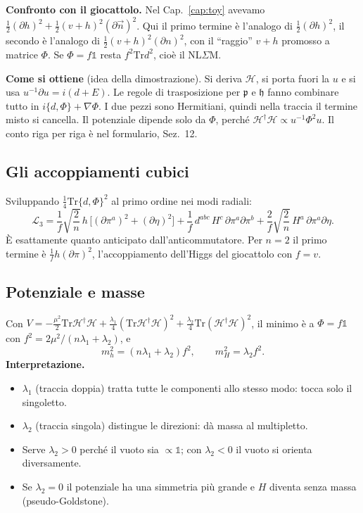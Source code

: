 \documentclass[11pt,a4paper]{article}
\numberwithin{equation}{section}
\theoremstyle{remark}
\newcommand{\Tr}{\mathrm{Tr}}
\newcommand{\Hf}{\mathcal{H}}
\newcommand{\p}{\mathfrak{p}}
\newcommand{\h}{\mathfrak{h}}
\newcommand{\one}{\mathbb{1}}
\begin{document}
\textbf{Confronto con il giocattolo.} Nel Cap.~\ref{cap:toy} avevamo $\frac12(\partial h)^2+\frac12(v+h)^2(\partial\vec n)^2$. Qui il primo termine è l'analogo di $\frac12(\partial h)^2$, il secondo è l'analogo di $\frac12(v+h)^2(\partial n)^2$, con il ``raggio'' $v+h$ promosso a matrice $\Phi$. Se $\Phi=f\one$ resta $f^2\Tr d^2$, cioè il NL$\Sigma$M.

\textbf{Come si ottiene} (idea della dimostrazione). Si deriva $\Hf$, si porta fuori la $u$ e si usa $u^{-1}\partial u=i(d+E)$. Le regole di trasposizione per $\p$ e $\h$ fanno combinare tutto in $i\{d,\Phi\}+\nabla\Phi$. I due pezzi sono Hermitiani, quindi nella traccia il termine misto si cancella. Il potenziale dipende solo da $\Phi$, perché $\Hf^\dagger\Hf\propto u^{-1}\Phi^2u$. Il conto riga per riga è nel formulario, Sez.~12.

\subsection{Gli accoppiamenti cubici}

Sviluppando $\frac14\Tr\{d,\Phi\}^2$ al primo ordine nei modi radiali:
\begin{equation}
\mathcal L_3=\frac1f\sqrt{\frac2n}\,h\,\big[(\partial\pi^a)^2+(\partial\eta)^2\big]+\frac1f\,d^{abc}\,H^c\,\partial\pi^a\partial\pi^b+\frac2f\sqrt{\frac2n}\,H^a\,\partial\pi^a\partial\eta .
\end{equation}
È esattamente quanto anticipato dall'anticommutatore. Per $n=2$ il primo termine è $\frac1f h(\partial\pi)^2$, l'accoppiamento dell'Higgs del giocattolo con $f=v$. \checkmark

\subsection{Potenziale e masse}

Con $V=-\frac{\mu^2}{2}\Tr\Hf^\dagger\Hf+\frac{\lambda_1}4(\Tr\Hf^\dagger\Hf)^2+\frac{\lambda_2}{4}\Tr(\Hf^\dagger\Hf)^2$, il minimo è a $\Phi=f\one$ con $f^2=2\mu^2/(n\lambda_1+\lambda_2)$, e
\begin{equation}
m_h^2=(n\lambda_1+\lambda_2)f^2,\qquad m_H^2=\lambda_2f^2 .
\end{equation}
\textbf{Interpretazione.}
\begin{itemize}
\item $\lambda_1$ (traccia doppia) tratta tutte le componenti allo stesso modo: tocca solo il singoletto.
\item $\lambda_2$ (traccia singola) distingue le direzioni: dà massa al multipletto.
\item Serve $\lambda_2>0$ perché il vuoto sia $\propto\one$; con $\lambda_2<0$ il vuoto si orienta diversamente.
\item Se $\lambda_2=0$ il potenziale ha una simmetria più grande e $H$ diventa senza massa (pseudo-Goldstone).
\end{itemize}
\end{document}
